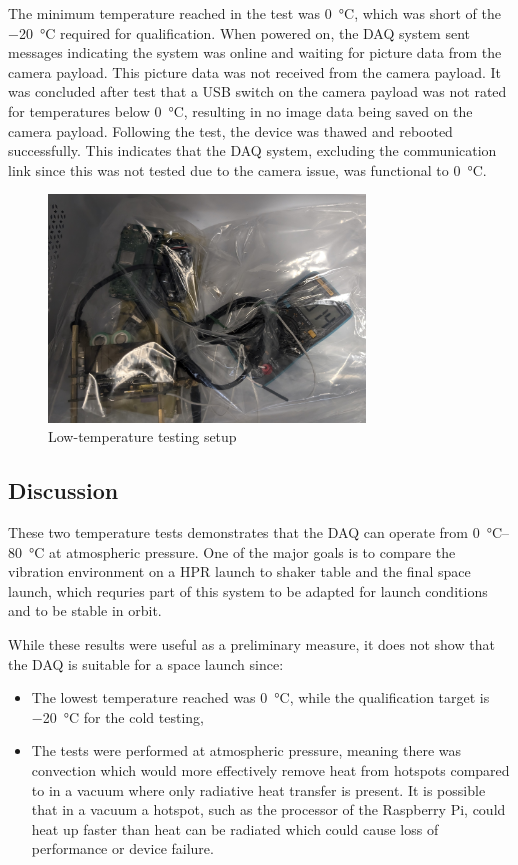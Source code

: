\documentclass[]{report}
\begin{document}
The minimum temperature reached in the test was \SI{0}{\degreeCelsius}, which was short of the \SI{-20}{\degreeCelsius} required for qualification. When powered on, the DAQ system sent messages indicating the system was online and waiting for picture data from the camera payload. This picture data was not received from the camera payload. It was concluded after test that a USB switch on the camera payload was not rated for temperatures below \SI{0}{\degreeCelsius}, resulting in no image data being saved on the camera payload. Following the test, the device was thawed and rebooted successfully. This indicates that the DAQ system, excluding the communication link since this was not tested due to the camera issue, was functional to \SI{0}{\degreeCelsius}.

\begin{figure}[H]
  \centering
  \includegraphics[width=0.75\textwidth]{images/fridge_test.jpg}
  \caption{Low-temperature testing setup}
  \label{fig:temperature-testing-fridge}
\end{figure}

\subsection{Discussion}

These two temperature tests demonstrates that the DAQ can operate from \SIrange{0}{80}{\degreeCelsius} at atmospheric pressure. One of the major goals is to compare the vibration environment on a HPR launch to shaker table and the final space launch, which requries part of this system to be adapted for launch conditions and to be stable in orbit.

While these results were useful as a preliminary measure, it does not show that the DAQ is suitable for a space launch since:
\begin{itemize}
  \item The lowest temperature reached was \SI{0}{\degreeCelsius}, while the qualification target is \SI{-20}{\degreeCelsius} for the cold testing,
  \item The tests were performed at atmospheric pressure, meaning there was convection which would more effectively remove heat from hotspots compared to in a vacuum where only radiative heat transfer is present. It is possible that in a vacuum a hotspot, such as the processor of the Raspberry Pi, could heat up faster than heat can be radiated which could cause loss of performance or device failure.
\end{itemize}
\end{document}
